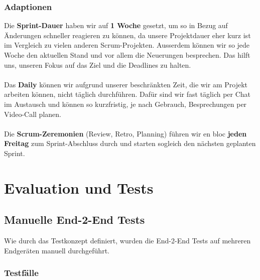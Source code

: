 \documentclass[a4paper,12pt]{report}
\begin{document}
    \subsection{Adaptionen}
    Die \textbf{Sprint-Dauer} haben wir auf \textbf{1 Woche} gesetzt, um so in Bezug auf Änderungen
    schneller reagieren zu können, da unsere Projektdauer eher kurz ist im Vergleich zu
    vielen anderen Scrum-Projekten.
    Ausserdem können wir so jede Woche den aktuellen Stand und vor allem die Neuerungen besprechen.
    Das hilft uns, unseren Fokus auf das Ziel und die Deadlines zu halten.
    \\\\
    Das \textbf{Daily} können wir aufgrund unserer beschränkten Zeit, die wir am Projekt arbeiten können, nicht täglich durchführen.
    Dafür sind wir fast täglich per Chat im Austausch und können so kurzfristig, je nach Gebrauch, Besprechungen per Video-Call planen.
    \\\\
    Die \textbf{Scrum-Zeremonien} (Review, Retro, Planning) führen wir en bloc \textbf{jeden Freitag} zum
    Sprint-Abschluss durch und starten sogleich den nächsten geplanten Sprint.


    \chapter{Evaluation und Tests}


    \section{Manuelle End-2-End Tests}\label{sec:manuelle-end-2-end-tests}
    Wie durch das Testkonzept definiert, wurden die End-2-End Tests auf mehreren Endgeräten manuell durchgeführt.

    \subsection{Testfälle}
\end{document}
